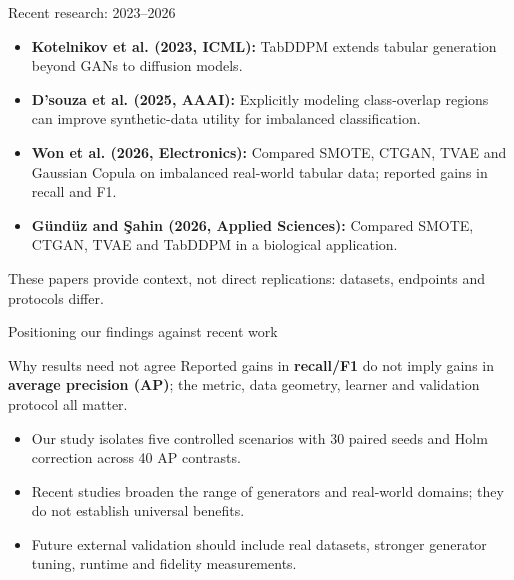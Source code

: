 \documentclass[aspectratio=169,11pt]{beamer}
\begin{document}
	\begin{frame}{Recent research: 2023--2026}
		\small
		\begin{itemize}\setlength\itemsep{0.65em}
			\item \textbf{Kotelnikov et al. (2023, ICML):} TabDDPM extends tabular generation beyond GANs to diffusion models.
			\item \textbf{D'souza et al. (2025, AAAI):} Explicitly modeling class-overlap regions can improve synthetic-data utility for imbalanced classification.
			\item \textbf{Won et al. (2026, Electronics):} Compared SMOTE, CTGAN, TVAE and Gaussian Copula on imbalanced real-world tabular data; reported gains in recall and F1.
			\item \textbf{G\"und\"uz and \c{S}ahin (2026, Applied Sciences):} Compared SMOTE, CTGAN, TVAE and TabDDPM in a biological application.
		\end{itemize}
		\vspace{0.3em}\scriptsize These papers provide context, not direct replications: datasets, endpoints and protocols differ.
	\end{frame}
	\begin{frame}{Positioning our findings against recent work}
		\small\begin{block}{Why results need not agree}
			Reported gains in \textbf{recall/F1} do not imply gains in \textbf{average precision (AP)}; the metric, data geometry, learner and validation protocol all matter.
		\end{block}
		\begin{itemize}\setlength\itemsep{0.65em}
			\item Our study isolates five controlled scenarios with 30 paired seeds and Holm correction across 40 AP contrasts.
			\item Recent studies broaden the range of generators and real-world domains; they do not establish universal benefits.
			\item Future external validation should include real datasets, stronger generator tuning, runtime and fidelity measurements.
		\end{itemize}
	\end{frame}
\end{document}
